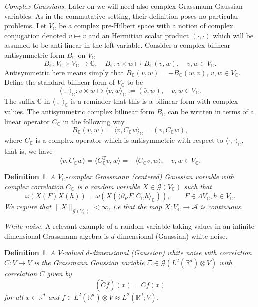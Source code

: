 \documentclass{article}
\newcommand{\Tau}{\mathrm{T}}
\newcommand{\assign}{:=}
\newcommand{\tmtextit}[1]{{\itshape{#1}}}
\newtheorem{definition}[theorem]{Definition}
\begin{document}
\tmtextit{Complex Gaussians.} Later on we will need also complex Grassmann
Gaussian variables. As in the commutative setting, their definition poses no
particular problems. Let $V_{\mathbb{C}}$ be a complex pre-Hilbert space with
a notion of complex conjugation denoted $v \mapsto \bar{v}$ and an Hermitian
scalar product $(\cdot, \cdot)$ which will be assumed to be anti-linear in the
left variable. Consider a complex bilinear antisymmetric form $B_{\mathbb{C}}$
on $V_{\mathbb{C}}$
\[ B_{\mathbb{C}} : V_{\mathbb{C}} \times V_{\mathbb{C}} \rightarrow
   \mathbb{C}, \quad B_{\mathbb{C}} : v \times w \mapsto B_{\mathbb{C}} (v,
   w), \quad v, w \in V_{\mathbb{C}} . \]
Antisymmetric here means simply that $B_{\mathbb{C}} (v, w) = - B_{\mathbb{C}}
(w, v)$, $v, w \in V_{\mathbb{C}}$. Define the standard bilinear form of
$V_{\mathbb{C}}$ to be
\[ \langle \cdot, \cdot \rangle_{\mathbb{C}} : v \times w \mapsto \langle v, w
   \rangle_{\mathbb{C}} \assign (\bar{v}, w), \quad v, w \in V_{\mathbb{C}} .
\]
The suffix $\mathbb{C}$ in $\langle \cdot, \cdot \rangle_{\mathbb{C}}$ is a
reminder that this is a bilinear form with complex values. The antisymmetric
complex bilinear form $B_{\mathbb{C}}$ can be written in terms of a linear
operator $C_{\mathbb{C}}$ in the following way
\[ B_{\mathbb{C}} (v, w) = \langle v, C_{\mathbb{C}} w \rangle_{\mathbb{C}} =
   (\bar{v}, C_{\mathbb{C}} w), \]
where $C_{\mathbb{C}}$ is a complex operator which is antisymmetric with
respect to $\langle \cdot, \cdot \rangle_{\mathbb{C}}$, that is, we have
\[ \langle v, C_{\mathbb{C}} w \rangle = \langle C_{\mathbb{C}}^{\Tau} v, w
   \rangle = - \langle C_{\mathbb{C}} v, w \rangle, \quad v, w \in
   V_{\mathbb{C}} . \]
\begin{definition}
  A $V_{\mathbb{C}}$-complex Grassmann (centered) Gaussian variable with
  complex correlation $C_{\mathbb{C}}$ is a random variable $X \in \mathcal{G}
  (V_{\mathbb{C}})$ such that
  \[ \omega (X (F) X (h)) = \omega (X (\langle \partial_R F, C_{\mathbb{C}} h
     \rangle_{\mathbb{C}})), \qquad F \in \Lambda V_{\mathbb{C}}, h \in
     V_{\mathbb{C}} . \]
  We require that $\| X \|_{\mathcal{G} (V_{\mathbb{C}})} < \infty$, i.e that
  the map $X : V_{\mathbb{C}} \rightarrow \mathcal{A}$ is continuous.
\end{definition}

\tmtextit{White noise.} A relevant example of a random variable taking values
in an infinite dimensional Grassmann algebra is $d$-dimensional (Gaussian)
white noise.

\begin{definition}
  \label{definition_Brownian}A $V$-valued $d$-dimensional (Gaussian) white
  noise with correlation $C : V \rightarrow V$ is the Grassmann Gaussian
  variable $\Xi \in \mathcal{G} (L^2 (\mathbb{R}^d) \otimes V)$ with
  correlation $\tilde{C}$ given by
  \[ (\tilde{C} f) (x) = C f (x) \]
  for all $x \in \mathbb{R}^d$ and $f \in L^2 (\mathbb{R}^d) \otimes V \approx
  L^2 (\mathbb{R}^d ; V)$.
\end{definition}
\end{document}
